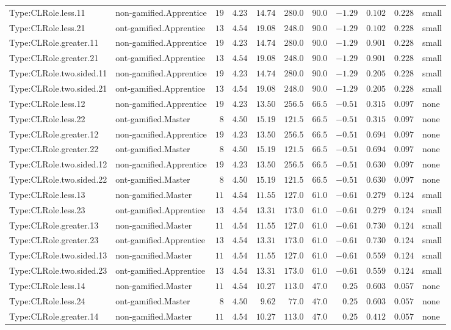 \documentclass[6pt,a4paper]{article}
\begin{document}
{\begin{longtable}{llrrrrrrrrl}
Type:CLRole.less.11&non-gamified.Apprentice&$19$&$4.23$&$14.74$&$280.0$&$ 90.0$&$-1.29$&$0.102$&$0.228$&small\tabularnewline
Type:CLRole.less.21&ont-gamified.Apprentice&$13$&$4.54$&$19.08$&$248.0$&$ 90.0$&$-1.29$&$0.102$&$0.228$&small\tabularnewline
Type:CLRole.greater.11&non-gamified.Apprentice&$19$&$4.23$&$14.74$&$280.0$&$ 90.0$&$-1.29$&$0.901$&$0.228$&small\tabularnewline
Type:CLRole.greater.21&ont-gamified.Apprentice&$13$&$4.54$&$19.08$&$248.0$&$ 90.0$&$-1.29$&$0.901$&$0.228$&small\tabularnewline
Type:CLRole.two.sided.11&non-gamified.Apprentice&$19$&$4.23$&$14.74$&$280.0$&$ 90.0$&$-1.29$&$0.205$&$0.228$&small\tabularnewline
Type:CLRole.two.sided.21&ont-gamified.Apprentice&$13$&$4.54$&$19.08$&$248.0$&$ 90.0$&$-1.29$&$0.205$&$0.228$&small\tabularnewline
Type:CLRole.less.12&non-gamified.Apprentice&$19$&$4.23$&$13.50$&$256.5$&$ 66.5$&$-0.51$&$0.315$&$0.097$&none\tabularnewline
Type:CLRole.less.22&ont-gamified.Master&$ 8$&$4.50$&$15.19$&$121.5$&$ 66.5$&$-0.51$&$0.315$&$0.097$&none\tabularnewline
Type:CLRole.greater.12&non-gamified.Apprentice&$19$&$4.23$&$13.50$&$256.5$&$ 66.5$&$-0.51$&$0.694$&$0.097$&none\tabularnewline
Type:CLRole.greater.22&ont-gamified.Master&$ 8$&$4.50$&$15.19$&$121.5$&$ 66.5$&$-0.51$&$0.694$&$0.097$&none\tabularnewline
Type:CLRole.two.sided.12&non-gamified.Apprentice&$19$&$4.23$&$13.50$&$256.5$&$ 66.5$&$-0.51$&$0.630$&$0.097$&none\tabularnewline
Type:CLRole.two.sided.22&ont-gamified.Master&$ 8$&$4.50$&$15.19$&$121.5$&$ 66.5$&$-0.51$&$0.630$&$0.097$&none\tabularnewline
Type:CLRole.less.13&non-gamified.Master&$11$&$4.54$&$11.55$&$127.0$&$ 61.0$&$-0.61$&$0.279$&$0.124$&small\tabularnewline
Type:CLRole.less.23&ont-gamified.Apprentice&$13$&$4.54$&$13.31$&$173.0$&$ 61.0$&$-0.61$&$0.279$&$0.124$&small\tabularnewline
Type:CLRole.greater.13&non-gamified.Master&$11$&$4.54$&$11.55$&$127.0$&$ 61.0$&$-0.61$&$0.730$&$0.124$&small\tabularnewline
Type:CLRole.greater.23&ont-gamified.Apprentice&$13$&$4.54$&$13.31$&$173.0$&$ 61.0$&$-0.61$&$0.730$&$0.124$&small\tabularnewline
Type:CLRole.two.sided.13&non-gamified.Master&$11$&$4.54$&$11.55$&$127.0$&$ 61.0$&$-0.61$&$0.559$&$0.124$&small\tabularnewline
Type:CLRole.two.sided.23&ont-gamified.Apprentice&$13$&$4.54$&$13.31$&$173.0$&$ 61.0$&$-0.61$&$0.559$&$0.124$&small\tabularnewline
Type:CLRole.less.14&non-gamified.Master&$11$&$4.54$&$10.27$&$113.0$&$ 47.0$&$ 0.25$&$0.603$&$0.057$&none\tabularnewline
Type:CLRole.less.24&ont-gamified.Master&$ 8$&$4.50$&$ 9.62$&$ 77.0$&$ 47.0$&$ 0.25$&$0.603$&$0.057$&none\tabularnewline
Type:CLRole.greater.14&non-gamified.Master&$11$&$4.54$&$10.27$&$113.0$&$ 47.0$&$ 0.25$&$0.412$&$0.057$&none\tabularnewline

\end{longtable}}
\end{document}
